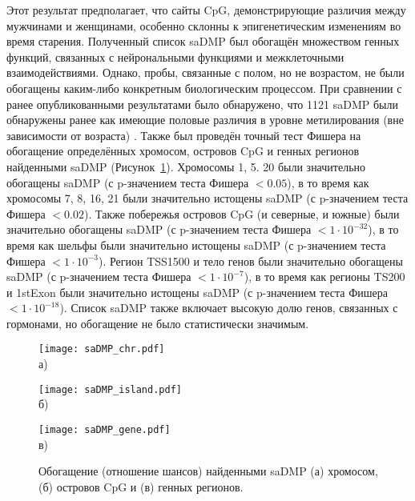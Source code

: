 Этот результат предполагает, что сайты CpG, демонстрирующие различия между мужчинами и женщинами, особенно склонны к эпигенетическим изменениям во время старения. Полученный список saDMP был обогащён множеством генных функций, связанных с нейрональными функциями и межклеточными взаимодействиями. Однако, пробы, связанные с полом, но не возрастом, не были обогащены каким-либо конкретным биологическим процессом. При сравнении с ранее опубликованными результатами было обнаружено, что 1121 saDMP были обнаружены ранее как имеющие половые различия в уровне метилирования (вне зависимости от возраста) \autocite{Inoshita2015, Singmann2015, Yousefi2015}. Также был проведён точный тест Фишера \autocite{fisher2006statistical} на обогащение определённых хромосом, островов CpG и генных регионов найденными saDMP (Рисунок~\ref{fig:saDMP_Fisher}). Хромосомы 1, 5. 20 были значительно обогащены saDMP (с p-значением теста Фишера $< 0.05$), в то время как хромосомы 7, 8, 16, 21 были значительно истощены saDMP (с p-значением теста Фишера $< 0.02$). Также побережья островов CpG (и северные, и южные) были значительно обогащены saDMP (с p-значением теста Фишера $< 1 \cdot 10^{-32}$), в то время как шельфы были значительно истощены saDMP (с p-значением теста Фишера $< 1 \cdot 10^{-3}$). Регион TSS1500 и тело генов были значительно обогащены saDMP (с p-значением теста Фишера $< 1 \cdot 10^{-7}$), в то время как регионы TS200 и 1stExon были значительно истощены saDMP (с p-значением теста Фишера $< 1 \cdot 10^{-18}$). Список saDMP также включает высокую долю генов, связанных с гормонами, но обогащение не было статистически значимым.

\begin{figure}[ht]
	\begin{minipage}[b][][b]{0.49\linewidth}\centering
		\texttt{[image: saDMP\_chr.pdf]} \\ а)
	\end{minipage}
	\hfill
	\begin{minipage}[b][][b]{0.49\linewidth}\centering
		\texttt{[image: saDMP\_island.pdf]} \\ б)
	\end{minipage}
	\begin{minipage}[b][][b]{0.99\linewidth}\centering
		\texttt{[image: saDMP\_gene.pdf]} \\ в)
	\end{minipage}
	\caption{Обогащение (отношение шансов) найденными saDMP (а) хромосом, (б) островов CpG и (в) генных регионов.}
	\label{fig:saDMP_Fisher}
\end{figure}

